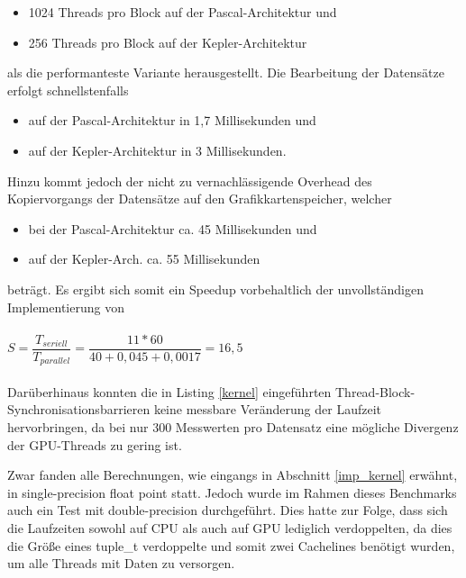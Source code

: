 \begin{itemize}
\item 1024 Threads pro Block auf der Pascal-Architektur und
\item 256 Threads pro Block auf der Kepler-Architektur
\end{itemize}
als die performanteste Variante herausgestellt. Die Bearbeitung der Datensätze erfolgt schnellstenfalls 
\begin{itemize}
\item auf der Pascal-Architektur in 1,7 Millisekunden und
\item auf der Kepler-Architektur in 3 Millisekunden.
\end{itemize}
Hinzu kommt jedoch der nicht zu vernachlässigende Overhead des Kopiervorgangs der Datensätze auf den Grafikkartenspeicher, welcher 
\begin{itemize}
\item bei der Pascal-Architektur ca. 45 Millisekunden und
\item auf der Kepler-Arch. ca. 55 Millisekunden
\end{itemize}
beträgt. Es ergibt sich somit ein Speedup vorbehaltlich der unvollständigen Implementierung von
\\\\
$S = \dfrac{T_{seriell}}{T_{parallel}} = \dfrac{11*60}{40+0,045+0,0017} = 16,5$
\\\\
Darüberhinaus konnten die in Listing \ref{kernel} eingeführten Thread-Block-Synchronisationsbarrieren keine messbare Veränderung der Laufzeit hervorbringen, da bei nur 300 Messwerten pro Datensatz eine mögliche Divergenz der GPU-Threads zu gering ist.

Zwar fanden alle Berechnungen, wie eingangs in Abschnitt \ref{imp_kernel} erwähnt, in single-precision float point statt. Jedoch wurde im Rahmen dieses Benchmarks auch ein Test mit double-precision durchgeführt. Dies hatte zur Folge, dass sich die Laufzeiten sowohl auf CPU als auch auf GPU lediglich verdoppelten, da dies die Größe eines tuple\_t verdoppelte und somit zwei Cachelines benötigt wurden, um alle Threads mit Daten zu versorgen.



